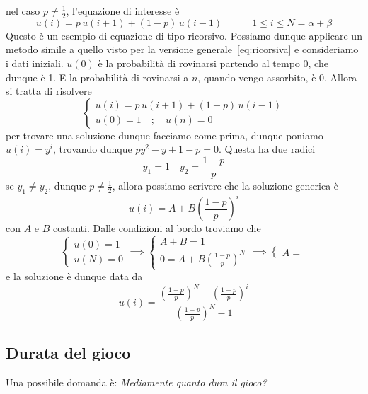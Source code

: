 nel caso \(p\neq \frac{1}{2}\), l'equazione di interesse è 
\[
  u{(i)} = p\, u {(i+1 )} + {(1-p)} \,u {(i-1)} \quad\quad\quad 1 \le  i \le N = \alpha +
  \beta
\]
Questo è un esempio di equazione di tipo ricorsivo. Possiamo dunque applicare un
metodo simile a quello visto per la versione generale~\eqref{eq:ricorsiva} e
consideriamo i dati iniziali. \(u{(0)}\) è la probabilità di rovinarsi partendo
al tempo 0, che dunque è 1. E la probabilità di rovinarsi a \(n\), quando vengo
assorbito, è 0. Allora si tratta di risolvere
\[
  \begin{cases}{}
      u{(i)} = p\, u{(i+1 )} + {(1-p)}\, u{(i-1)}\\
      u{(0)} = 1 \quad ; \quad u{(n)} = 0
  \end{cases}
\]
per trovare una soluzione dunque facciamo come prima, dunque poniamo \(u{(i)} =
y^{i}\), trovando dunque \(p y^2 - y + 1-p = 0\). Questa ha due radici
\[
  y_{1} = 1 \quad y_{2} = \frac{1-p}{p}
\]
se \(y_{1} \neq y_{2}\), dunque \(p \neq \frac{1}{2}\), allora possiamo scrivere
che la soluzione generica è 
\[
  u{(i)} = A + B {\left( \frac{1-p}{p} \right)} ^{i} 
\]
con \(A\) e \(B\) costanti. Dalle condizioni al bordo troviamo che
\[
    \begin{cases}{}
        u{(0)} = 1\\
        u{(N)} = 0
    \end{cases}
    \implies 
    \begin{cases}{}
        A+B = 1\\
        0 = A + B {\left( \frac{1-p}{p} \right)} ^{N}
    \end{cases}
    \implies 
    \begin{cases}{}
        A = 
    \end{cases}
\]
e la soluzione è dunque data da 
\[
  u{(i)} = \frac{{\left( \frac{1-p}{p} \right)} ^{N} - {\left( \frac{1-p}{p}
  \right)} ^{i}}{{\left( \frac{1-p}{p} \right)} ^{N} - 1}
\]

\subsection{Durata del gioco}
Una possibile domanda è: \emph{Mediamente quanto dura il gioco?}

